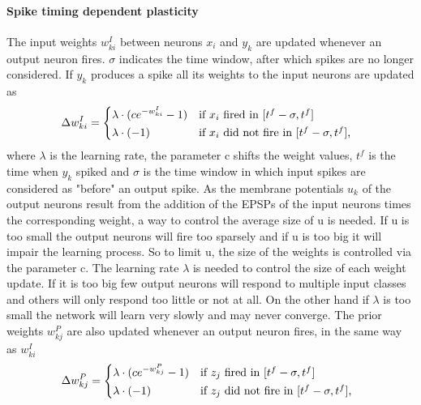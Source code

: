 \paragraph{Spike timing dependent plasticity}
The input weights $w^{I}_{ki}$ between neurons $x_i$ and $y_k$ are updated whenever an output neuron fires. $\sigma$ indicates the time window, after which spikes are no longer considered. If $y_k$ produces a spike all its weights to the input neurons are updated as
\begin{equation}
\label{deltawki}
\Delta w^{I}_{ki} = \begin{dcases*} \lambda \cdot (ce^{-w^{I}_{ki}} - 1) & if $x_{i}$ fired in $ [t^f - \sigma, t^f] $ \\
\lambda \cdot (-1) & \text{if $ x_i $ did not fire in $ [t^f - \sigma, t^f] $, } \end{dcases*}
\end{equation}
where $\lambda$ is the learning rate, the parameter c shifts the weight values, $t^f$ is the time when $y_k$ spiked and $\sigma$ is the time window in which input spikes are considered as "before" an output spike. As the membrane potentials $u_k$ of the output neurons result from the addition of the EPSPs of the input neurons times the corresponding weight, a way to control the average size of u is needed. If u is too small the output neurons will fire too sparsely and if u is too big it will impair the learning process. So to limit u, the size of the weights is controlled via the parameter c. The learning rate $\lambda$ is needed to control the size of each weight update. If it is too big few output neurons will respond to multiple input classes and others will only respond too little or not at all. On the other hand if $\lambda$ is too small the network will learn very slowly and may never converge.
The prior weights $w^{P}_{kj}$ are also updated whenever an output neuron fires, in the same way as $w^{I}_{ki}$
\begin{equation}
\label{deltawkj}
\Delta w^{P}_{kj} = \begin{dcases*} \lambda \cdot (ce^{-w^{P}_{kj}} - 1) & if $z_{j}$ fired in $ [t^f - \sigma, t^f] $ \\
\lambda \cdot (-1) & \text{if $ z_j $ did not fire in $ [t^f - \sigma, t^f] $, } \end{dcases*}
\end{equation}

